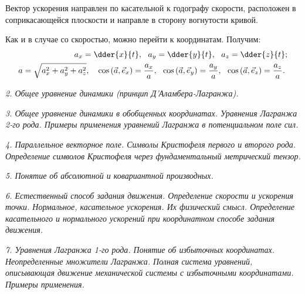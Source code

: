 Вектор ускорения направлен по касательной к годографу скорости, расположен в
соприкасающейся плоскости и направле в сторону вогнутости кривой.

Как и в случае со скоростью, можно перейти к координатам. Получим:
\begin{align*}
    a_x = \dder{x}{t},\ \ a_y & = \dder{y}{t},\ \ a_z = \dder{z}{t}; \\
    a = \sqrt{a_x^2 + a_y^2 + a_z^2}, \quad
    \cos\left(\vec{a}, \vec{e}_x\right) = \frac{a_x}{a}, & \ \ 
    \cos\left(\vec{a}, \vec{e}_y\right) = \frac{a_y}{a},\ \ 
    \cos\left(\vec{a}, \vec{e}_z\right) = \frac{a_z}{a}.
\end{align*}

\newpage %

\emph{2. Общее уравнение динамики (принцип Д'Аламбера-Лагранжа).}

\newpage %

\emph{3. Общее уравнение динамики в обобщенных координатах. Уравнения Лагранжа
2-го рода. Примеры применения уравнений Лагранжа в потенциальном поле сил.}

\newpage %

\emph{4. Параллельное векторное поле. Символы Кристофеля первого и второго
рода. Определение символов Кристофеля через фундаментальный метрический тензор.}

\newpage %

\emph{5. Понятие об абсолютной и ковариантной производных.}

\newpage %

\emph{6. Естественный способ задания движения. Определение скорости и ускорения
точки. Нормальное, касательное ускорения. Их физический смысл. Определение
касательного и нормального ускорений при координатном способе задания движения.}



\newpage %

\emph{7. Уравнения Лагранжа 1-го рода. Понятие об избыточных координатах.
Неопределенные множители Лагранжа. Полная система уравнений, описывающая
движение механической системы с избыточными координатами. Примеры применения.}

